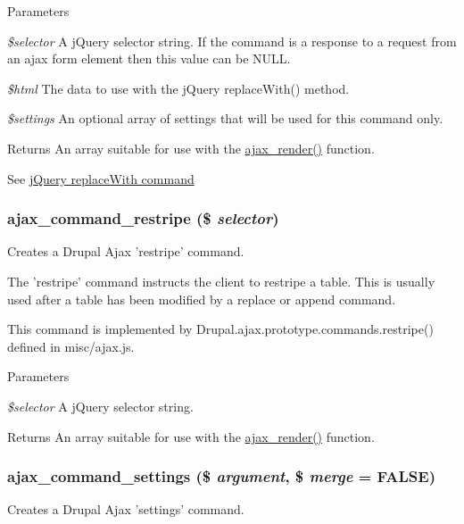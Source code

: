 \begin{DoxyParams}{Parameters}
\item[{\em \$selector}]A jQuery selector string. If the command is a response to a request from an ajax form element then this value can be NULL. \item[{\em \$html}]The data to use with the jQuery replaceWith() method. \item[{\em \$settings}]An optional array of settings that will be used for this command only.\end{DoxyParams}
\begin{DoxyReturn}{Returns}
An array suitable for use with the \hyperlink{group__ajax_ga241c2426bdde049c55b05b7bf5d714a2}{ajax\_\-render()} function.
\end{DoxyReturn}
See \hyperlink{}{jQuery replaceWith command } \hypertarget{group__ajax__commands_ga59f78e53dfd51237ccedfaa0266b7f37}{
\subsubsection[{ajax\_\-command\_\-restripe}]{\setlength{\rightskip}{0pt plus 5cm}ajax\_\-command\_\-restripe (\$ {\em selector})}}
\label{group__ajax__commands_ga59f78e53dfd51237ccedfaa0266b7f37}
Creates a Drupal Ajax 'restripe' command.

The 'restripe' command instructs the client to restripe a table. This is usually used after a table has been modified by a replace or append command.

This command is implemented by Drupal.ajax.prototype.commands.restripe() defined in misc/ajax.js.


\begin{DoxyParams}{Parameters}
\item[{\em \$selector}]A jQuery selector string.\end{DoxyParams}
\begin{DoxyReturn}{Returns}
An array suitable for use with the \hyperlink{group__ajax_ga241c2426bdde049c55b05b7bf5d714a2}{ajax\_\-render()} function. 
\end{DoxyReturn}
\hypertarget{group__ajax__commands_ga3e41169f97184258a213d512cef81131}{
\subsubsection[{ajax\_\-command\_\-settings}]{\setlength{\rightskip}{0pt plus 5cm}ajax\_\-command\_\-settings (\$ {\em argument}, \/  \$ {\em merge} = {\ttfamily FALSE})}}
\label{group__ajax__commands_ga3e41169f97184258a213d512cef81131}
Creates a Drupal Ajax 'settings' command.

